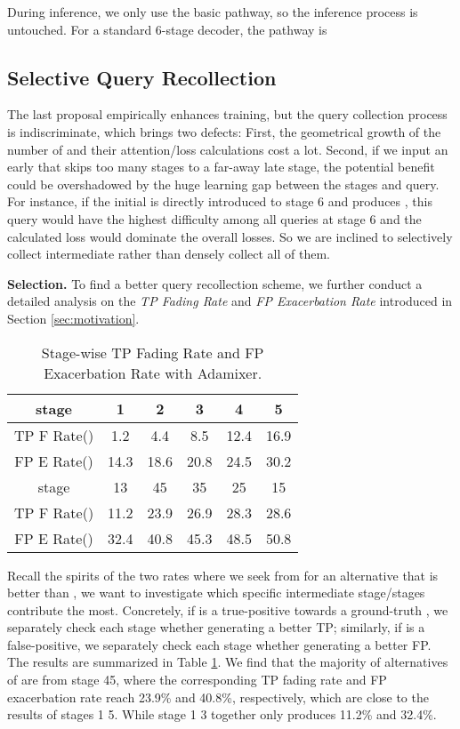 \documentclass[10pt,twocolumn,letterpaper]{article}
\begin{document}
During inference, we only use the basic pathway, so the inference process is untouched. For a standard 6-stage decoder, the pathway is 

\subsection{Selective Query Recollection}
The last proposal empirically enhances training, but the query collection process is indiscriminate, which brings two defects:
First, the geometrical growth of the number of  and their attention/loss calculations cost a lot. Second, if we input an early  that skips too many stages to a far-away late stage, the potential benefit could be overshadowed by the huge learning gap between the stages and query. For instance, if the initial  is directly introduced to stage 6 and produces , this query would have the highest difficulty among all queries at stage 6 and the calculated loss would dominate the overall losses. So we are inclined to selectively collect intermediate  rather than densely collect all of them. 

\textbf{Selection.} To find a better query recollection scheme, we further conduct a detailed analysis on the \textit{TP Fading Rate} and \textit{FP Exacerbation Rate} introduced in Section \ref{sec:motivation}. 

\begin{table}[]
\centering
    \begin{tabular}{c|c|c|c|c|c}
        \toprule[1pt]
        stage          & 1   & 2 & 3 & 4 & 5   \\ 
        \midrule
        TP F Rate()&  1.2  & 4.4 & 8.5 & 12.4 &16.9   \\ 
        FP E Rate()&  14.3 & 18.6 & 20.8 & 24.5 & 30.2  \\
        \midrule[1pt]
        stage    &  13   & 45 & 35 & 25 & 15  \\ 
        \midrule
        TP F Rate()&   11.2 & 23.9 & 26.9 & 28.3 & 28.6 \\ 
        FP E Rate()&   32.4 & 40.8 & 45.3 & 48.5 & 50.8 \\
        \bottomrule
    \end{tabular}
    \caption{Stage-wise TP Fading Rate and FP Exacerbation Rate with Adamixer.}
    \label{tab:dif_s4rates}
\end{table}

Recall the spirits of the two rates where we seek from  for an alternative that is better than  , we want to investigate which specific intermediate stage/stages contribute the most. 
Concretely, if  is a true-positive towards a ground-truth , we separately check each stage whether generating a better TP; similarly, if  is a false-positive, we separately check each stage whether generating a better FP. The results are summarized in Table \ref{tab:dif_s4rates}. We find that the majority of alternatives of  are from stage 45, where the corresponding TP fading rate and FP exacerbation rate reach 23.9\% and 40.8\%, respectively, which are close to the results of stages 1  5. While stage 1  3 together only produces 11.2\% and 32.4\%. 
\end{document}
